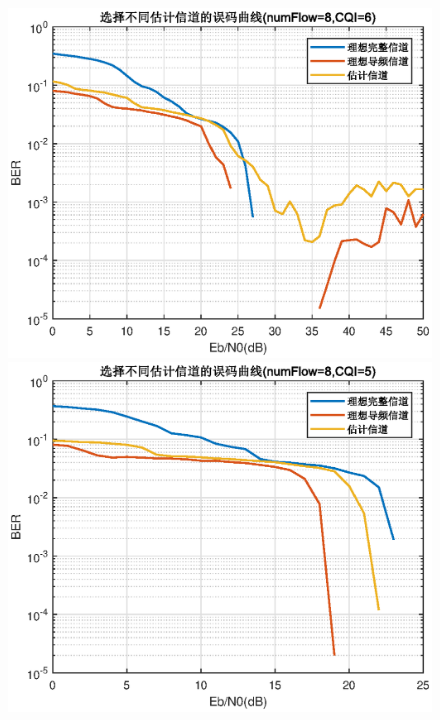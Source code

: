 \documentclass{article}
\begin{document}
\begin{figure}[htbp]
	\centering
	\begin{minipage}[t]{0.48\textwidth}
	\centering
	\includegraphics[width=\textwidth]{plot/plot_CQI6.eps}
	\end{minipage}
	\begin{minipage}[t]{0.48\textwidth}
	\centering
	\includegraphics[width=\textwidth]{plot/plot_CQI5.eps}
	\end{minipage}
\end{figure}
\end{document}
